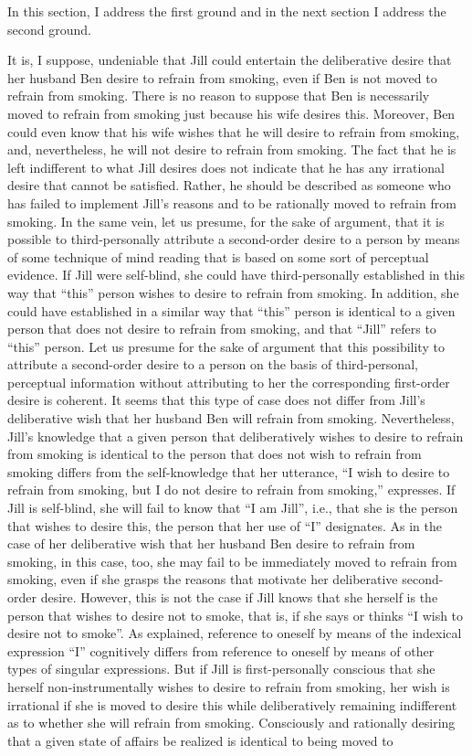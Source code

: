 \documentclass[output=paper]{langscibook}
\begin{document}
In this section, I address the first ground and in the next section I address the second ground. 

It is, I suppose, undeniable that Jill could entertain the deliberative desire that her husband Ben desire to refrain from smoking, even if Ben is not moved to refrain from smoking. There is no reason to suppose that Ben is necessarily moved to refrain from smoking just because his wife desires this. Moreover, Ben could even know that his wife wishes that he will desire to refrain from smoking, and, nevertheless, he will not desire to refrain from smoking. The fact that he is left indifferent to what Jill desires does not indicate that he has any irrational desire that cannot be satisfied. Rather, he should be described as someone who has failed to implement Jill's reasons and to be rationally moved to refrain from smoking. In the same vein, let us presume, for the sake of argument, that it is possible to third-personally attribute a second-order desire to a person by means of some technique of mind reading that is based on some sort of perceptual evidence. If Jill were self-blind, she could have third-personally established in this way that “this” person wishes to desire to refrain from smoking. In addition, she could have established in a similar way that “this” person is identical to a given person that does not desire to refrain from smoking, and that “Jill” refers to “this” person. Let us presume for the sake of argument that this possibility to attribute a second-order desire to a person on the basis of third-personal, perceptual information without attributing to her the corresponding first-order desire is coherent. It seems that this type of case does not differ from Jill’s deliberative wish that her husband Ben will refrain from smoking. Nevertheless, Jill’s knowledge that a given person that deliberatively wishes to desire to refrain from smoking is identical to the person that does not wish to refrain from smoking differs from the self-knowledge that her utterance, “I wish to desire to refrain from smoking, but I do not desire to refrain from smoking,” expresses. If Jill is self-blind, she will fail to know that “I am Jill”, i.e., that she is the person that wishes to desire this, the person that her use of “I” designates. As in the case of her deliberative wish that her husband Ben desire to refrain from smoking, in this case, too, she may fail to be immediately moved to refrain from smoking, even if she grasps the reasons that motivate her deliberative second-order desire. However, this is not the case if Jill knows that she herself is the person that wishes to desire not to smoke, that is, if  she says or thinks “I wish to desire not to smoke”. As \citet{perry1979problem} explained, reference to oneself by means of the indexical expression “I” cognitively differs from reference to oneself by means of other types of singular expressions.  But if Jill is first-personally conscious that she herself non-instrumentally wishes to desire to refrain from smoking, her wish is irrational if she is moved to desire this while deliberatively remaining indifferent as to whether she will refrain from smoking. Consciously and rationally desiring that a given state of affairs be realized is identical to being moved to 
\end{document}
